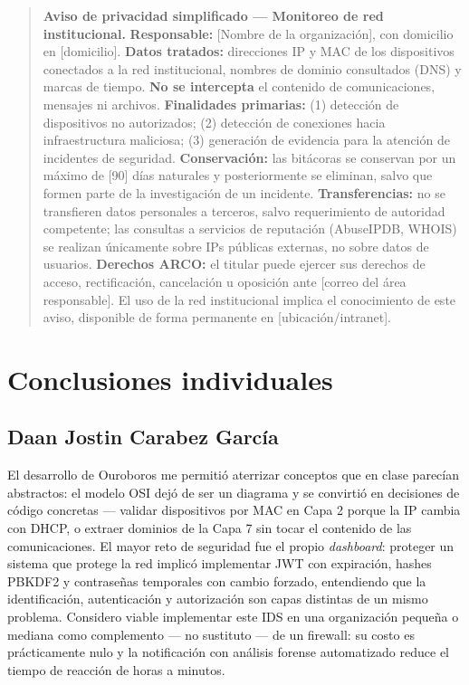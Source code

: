\documentclass[12pt,letterpaper]{report}
\begin{document}
\begin{quote}
\small
\textbf{Aviso de privacidad simplificado --- Monitoreo de red institucional.}
\textbf{Responsable:} [Nombre de la organización], con domicilio en
[domicilio]. \textbf{Datos tratados:} direcciones IP y MAC de los
dispositivos conectados a la red institucional, nombres de dominio
consultados (DNS) y marcas de tiempo. \textbf{No se intercepta} el contenido
de comunicaciones, mensajes ni archivos. \textbf{Finalidades primarias:}
(1) detección de dispositivos no autorizados; (2) detección de conexiones
hacia infraestructura maliciosa; (3) generación de evidencia para la
atención de incidentes de seguridad. \textbf{Conservación:} las bitácoras se
conservan por un máximo de [90] días naturales y posteriormente se
eliminan, salvo que formen parte de la investigación de un incidente.
\textbf{Transferencias:} no se transfieren datos personales a terceros,
salvo requerimiento de autoridad competente; las consultas a servicios de
reputación (AbuseIPDB, WHOIS) se realizan únicamente sobre IPs públicas
externas, no sobre datos de usuarios. \textbf{Derechos ARCO:} el titular
puede ejercer sus derechos de acceso, rectificación, cancelación u oposición
ante [correo del área responsable]. El uso de la red institucional implica
el conocimiento de este aviso, disponible de forma permanente en
[ubicación/intranet].
\end{quote}

\chapter{Conclusiones individuales}

\section{Daan Jostin Carabez García}

El desarrollo de Ouroboros me permitió aterrizar conceptos que en clase
parecían abstractos: el modelo OSI dejó de ser un diagrama y se convirtió en
decisiones de código concretas --- validar dispositivos por MAC en Capa 2
porque la IP cambia con DHCP, o extraer dominios de la Capa 7 sin tocar el
contenido de las comunicaciones. El mayor reto de seguridad fue el propio
\textit{dashboard}: proteger un sistema que protege la red implicó
implementar JWT con expiración, hashes PBKDF2 y contraseñas temporales con
cambio forzado, entendiendo que la identificación, autenticación y
autorización son capas distintas de un mismo problema. Considero viable
implementar este IDS en una organización pequeña o mediana como complemento
--- no sustituto --- de un firewall: su costo es prácticamente nulo y la
notificación con análisis forense automatizado reduce el tiempo de reacción
de horas a minutos.
\end{document}

